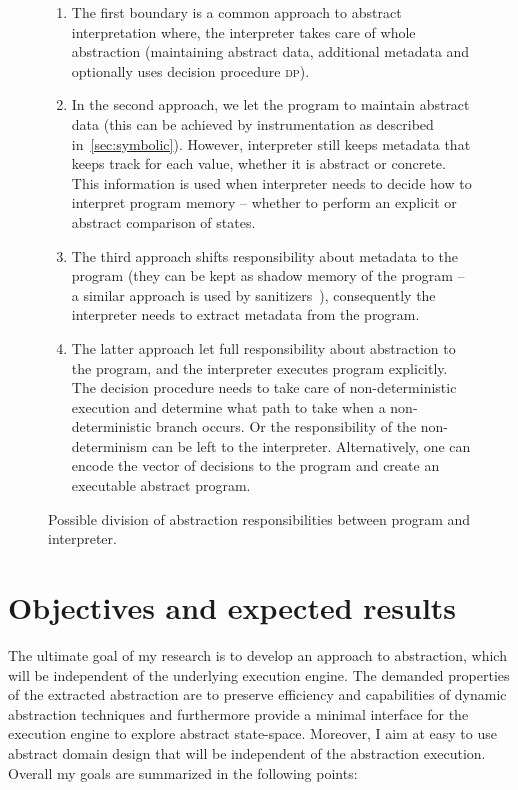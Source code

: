 \begin{figure}[h]
{
}

\bigskip
\prule

\begin{enumerate}
    \item The first boundary is a common approach to abstract
        interpretation where, the interpreter takes care of whole abstraction
        (maintaining abstract data, additional metadata and optionally uses
        decision procedure \textsc{dp}).
    \item In the second approach, we let the program to maintain abstract
        data (this can be achieved by instrumentation as described
        in~\autoref{sec:symbolic}).  However, interpreter still keeps metadata
        that keeps track for each value, whether it is abstract or concrete.
        This information is used when interpreter needs to decide how to
        interpret program memory -- whether to perform an explicit or abstract
        comparison of states.
    \item The third approach shifts responsibility about metadata to
        the program (they can be kept as shadow memory of the program -- a
        similar approach is used by sanitizers~\cite{Stepanov2015}), consequently the
        interpreter needs to extract metadata from the program.
    \item The latter approach let full responsibility about abstraction to the
        program, and the interpreter executes program explicitly. The decision
        procedure needs to take care of non-deterministic execution and
        determine what path to take when a non-deterministic branch occurs. Or
        the responsibility of the non-determinism can be left to the
        interpreter. Alternatively, one can encode the vector of decisions to
        the program and create an executable abstract program.
\end{enumerate}

\caption{Possible division of abstraction responsibilities between program and interpreter.}
\label{fig:bounds}

\end{figure}

\section{Objectives and expected results}
\label{sec:objectives}

The ultimate goal of my research is to develop an approach to abstraction,
which will be independent of the underlying execution engine. The demanded
properties of the extracted abstraction are to preserve efficiency and
capabilities of dynamic abstraction techniques and furthermore provide a
minimal interface for the execution engine to explore abstract state-space.
Moreover, I aim at easy to use abstract domain design that will be independent
of the abstraction execution. Overall my goals are summarized in the following
points:

